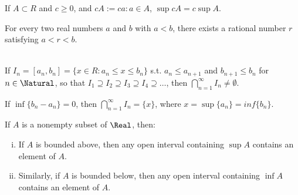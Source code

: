 \begin{theorem}
  If $A \subset R$ and $c \geq 0$, and $cA := {ca : a \in A}$, $\sup cA = c \sup A$.
\end{theorem}


\begin{theorem}
  For every two real numbers $a$ and $b$ with $a < b$, there exists a rational number $r$ satisfying $a < r < b$.
\end{theorem}


\begin{namedtheorem} \leavevmode \\
  If $I_n = [a_n, b_n] = \{x \in R : a_n \leq x \leq b_n\}$ s.t. $a_n \leq a_{n + 1}$ and $b_{n+1} \leq b_n$ for $n \in \Natural$, so that $I_1 \supseteq I_2 \supseteq I_3 \supseteq I_4 \supseteq \ldots$, then $\displaystyle \bigcap_{n=1}^{\infty}I_n \neq \emptyset$.

  If $\inf \{b_n - a_n\} = 0$, then $\displaystyle \bigcap_{n=1}^{\infty}I_n = \{x\}$, where $x = \sup \{a_n\} = inf \{ b_n \}$.
\end{namedtheorem}


\begin{namedtheorem} If $A$ is a nonempty subset of $\Real$, then:
  \begin{enumerate}[(i)]
    \item If $A$ is bounded above, then any open interval containing $\sup A$ contains an element of $A$.
    \item Similarly, if $A$ is bounded below, then any open interval containing $\inf A$ contains an element of $A$.
  \end{enumerate}
\end{namedtheorem}



